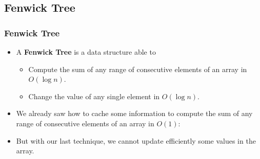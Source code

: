 \documentclass{beamer}
\begin{document}







\subsection{Fenwick Tree}

\begin{frame}%
\frametitle{Fenwick Tree}

\begin{itemize}

\item A \textbf{Fenwick Tree} is a data structure able to
\begin{itemize}
\item<1-> Compute the sum of any range of consecutive elements of an array
in $O(\log n)$.
\item<1-> Change the value of any single element in $O(\log n)$.
\end{itemize}

\vspace{0.2cm}
\item<2-> We already saw how to cache some information to compute the sum of any range
of consecutive elements of an array in $O(1)$:


\item<7-> But with our last technique, we cannot update efficiently some values in the array.

\end{itemize}

\end{frame}
\end{document}
